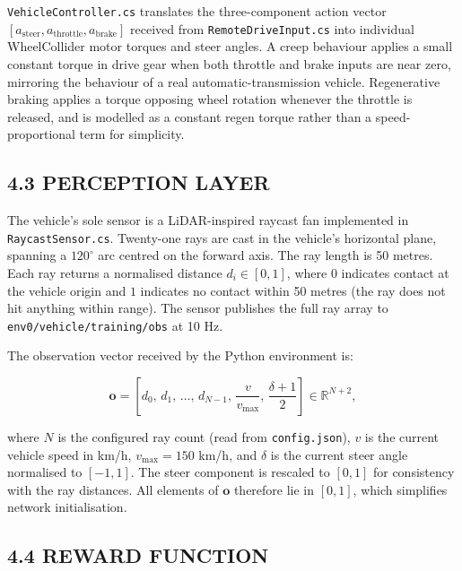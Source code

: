 \documentclass[12pt,a4paper]{article}
\begin{document}
\texttt{VehicleController.cs} translates the three-component action vector
$[a_\text{steer}, a_\text{throttle}, a_\text{brake}]$ received from
\texttt{RemoteDriveInput.cs} into individual WheelCollider motor torques and
steer angles. A creep behaviour applies a small constant torque in drive gear
when both throttle and brake inputs are near zero, mirroring the behaviour of a
real automatic-transmission vehicle. Regenerative braking applies a torque
opposing wheel rotation whenever the throttle is released, and is modelled as a
constant regen torque rather than a speed-proportional term for simplicity.

\subsection*{4.3 \quad PERCEPTION LAYER}

\indent The vehicle's sole sensor is a LiDAR-inspired raycast fan implemented in
\texttt{RaycastSensor.cs}. Twenty-one rays are cast in the vehicle's horizontal
plane, spanning a $120^{\circ}$ arc centred on the forward axis. The ray length
is 50 metres. Each ray returns a normalised distance $d_i \in [0, 1]$, where
$0$ indicates contact at the vehicle origin and $1$ indicates no contact within
50 metres (the ray does not hit anything within range). The sensor publishes the
full ray array to \texttt{env0/vehicle/training/obs} at 10 Hz.

The observation vector received by the Python environment is:

\begin{equation}
  \mathbf{o} = \left[ d_0,\, d_1,\, \ldots,\, d_{N-1},\,
                      \frac{v}{v_{\max}},\,
                      \frac{\delta + 1}{2} \right] \in \mathbb{R}^{N+2},
  \label{eq:obs}
\end{equation}

\noindent where $N$ is the configured ray count (read from \texttt{config.json}),
$v$ is the current vehicle speed in km/h, $v_{\max} = 150$ km/h, and $\delta$
is the current steer angle normalised to $[-1, 1]$. The steer component is
rescaled to $[0, 1]$ for consistency with the ray distances. All elements of
$\mathbf{o}$ therefore lie in $[0, 1]$, which simplifies network initialisation.

\subsection*{4.4 \quad REWARD FUNCTION}
\end{document}
